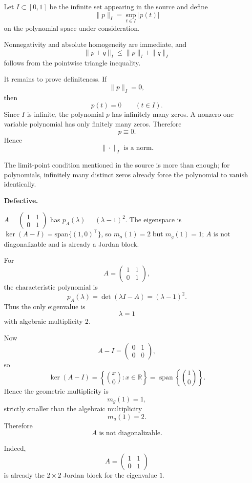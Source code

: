\begin{solution}
Let \(I\subset[0,1]\) be the infinite set appearing in the source and define
\[
\|p\|_I=\sup_{t\in I}|p(t)|
\]
on the polynomial space under consideration.

Nonnegativity and absolute homogeneity are immediate, and
\[
\|p+q\|_I
\le
\|p\|_I+\|q\|_I
\]
follows from the pointwise triangle inequality.

It remains to prove definiteness. If
\[
\|p\|_I=0,
\]
then
\[
p(t)=0
\qquad(t\in I).
\]
Since \(I\) is infinite, the polynomial \(p\) has infinitely many zeros. A nonzero
one-variable polynomial has only finitely many zeros. Therefore
\[
p\equiv0.
\]
Hence
\[
\boxed{\|\cdot\|_I\text{ is a norm}.}
\]

The limit-point condition mentioned in the source is more than enough; for polynomials,
infinitely many distinct zeros already force the polynomial to vanish identically.
\end{solution}


\begin{problem}[CP-II-0042]
\label{prob:cp-ii-0042}
\textbf{Defective.}

\hspace*{1.5em}$A=\begin{pmatrix}1&1\\0&1\end{pmatrix}$ has $p_A(\lambda)=(\lambda-1)^2$. The eigenspace is $\ker(A-I)=\mathrm{span}\{(1,0)^\top\}$, so $m_a(1)=2$ but $m_g(1)=1$; $A$ is not diagonalizable and is already a Jordan block.
\end{problem}

\begin{solution}
For
\[
A=
\begin{pmatrix}
1&1\\
0&1
\end{pmatrix},
\]
the characteristic polynomial is
\[
p_A(\lambda)
=
\det(\lambda I-A)
=
(\lambda-1)^2.
\]
Thus the only eigenvalue is
\[
\lambda=1
\]
with algebraic multiplicity \(2\).

Now
\[
A-I
=
\begin{pmatrix}
0&1\\
0&0
\end{pmatrix},
\]
so
\[
\ker(A-I)
=
\left\{
\binom{x}{0}:x\in\mathbb R
\right\}
=
\operatorname{span}\left\{
\binom10
\right\}.
\]
Hence the geometric multiplicity is
\[
m_g(1)=1,
\]
strictly smaller than the algebraic multiplicity
\[
m_a(1)=2.
\]
Therefore
\[
\boxed{A\text{ is not diagonalizable}.}
\]

Indeed,
\[
A=
\begin{pmatrix}
1&1\\
0&1
\end{pmatrix}
\]
is already the \(2\times2\) Jordan block for the eigenvalue \(1\).
\end{solution}


